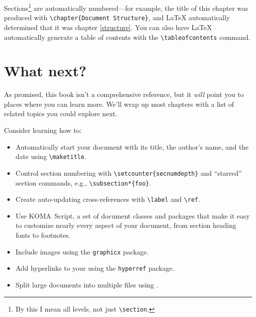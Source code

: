 Sections\footnote{By this I mean all levels, not just
\texttt{\textbackslash section}.}
are automatically numbered---for example,
the title of this chapter was produced with \verb|\chapter{Document Structure}|,
and \LaTeX{} automatically determined that it was chapter \ref{structure}.
You can also have \LaTeX{} automatically generate a table of contents
with the \verb|\tableofcontents| command.

\section{What next?}

As promised, this book isn't a comprehensive reference,
but it \emph{will} point you to places where you can learn more.
We'll wrap up most chapters with a list of related topics you could
explore next.

Consider learning how to:
\begin{itemize}
\item Automatically start your document with its title, the author's name,
    and the date using \verb|\maketitle|.
\item Control section numbering with \verb|\setcounter{secnumdepth}|
and ``starred'' section commands, e.g., \verb|\subsection*{foo}|.
\item Create auto-updating cross-references with \verb|\label| and \verb|\ref|.
\item Use KOMA~Script, a set of document classes and packages
that make it easy to customize nearly every aspect of your document,
from section heading fonts to footnotes.
\item Include images using the \texttt{graphicx} package.
\item Add hyperlinks to your  using the \texttt{hyperref} package.
\item Split large documents into multiple files using \verb||.
\end{itemize}
